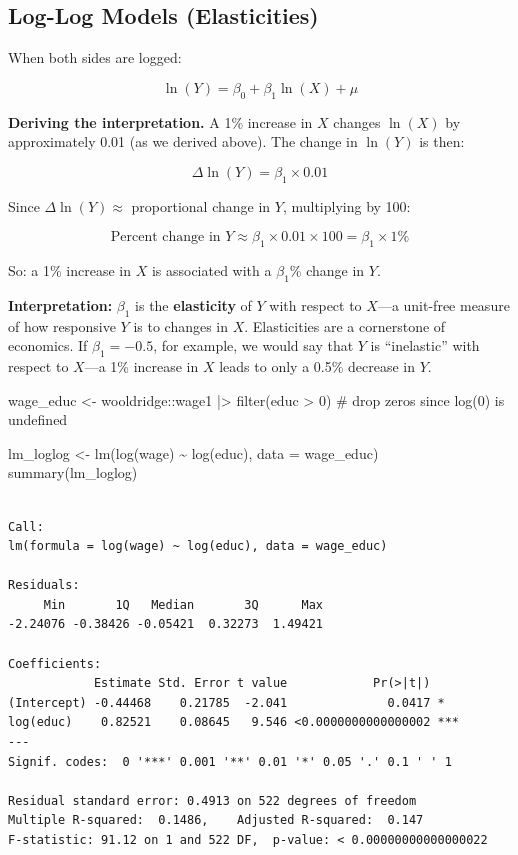 \documentclass[
  letterpaper,
  DIV=11,
  numbers=noendperiod]{scrreprt}
\newenvironment{Shaded}{\begin{snugshade}}{\end{snugshade}}
\newcommand{\AttributeTok}[1]{\textcolor[rgb]{0.40,0.45,0.13}{#1}}
\newcommand{\CommentTok}[1]{\textcolor[rgb]{0.37,0.37,0.37}{#1}}
\newcommand{\DecValTok}[1]{\textcolor[rgb]{0.68,0.00,0.00}{#1}}
\newcommand{\FunctionTok}[1]{\textcolor[rgb]{0.28,0.35,0.67}{#1}}
\newcommand{\NormalTok}[1]{\textcolor[rgb]{0.00,0.23,0.31}{#1}}
\newcommand{\OtherTok}[1]{\textcolor[rgb]{0.00,0.23,0.31}{#1}}
\newcommand{\SpecialCharTok}[1]{\textcolor[rgb]{0.37,0.37,0.37}{#1}}
\begin{document}
\subsection{Log-Log Models
(Elasticities)}\label{log-log-models-elasticities}

When both sides are logged:

\[
\ln(Y) = \beta_0 + \beta_1 \ln(X) + \mu
\]

\textbf{Deriving the interpretation.} A 1\% increase in \(X\) changes
\(\ln(X)\) by approximately 0.01 (as we derived above). The change in
\(\ln(Y)\) is then:

\[
\Delta \ln(Y) = \beta_1 \times 0.01
\]

Since \(\Delta \ln(Y) \approx\) proportional change in \(Y\),
multiplying by 100:

\[
\text{Percent change in } Y \approx \beta_1 \times 0.01 \times 100 = \beta_1 \times 1\%
\]

So: a 1\% increase in \(X\) is associated with a \(\beta_1\)\% change in
\(Y\).

\textbf{Interpretation:} \(\beta_1\) is the \textbf{elasticity} of \(Y\)
with respect to \(X\)---a unit-free measure of how responsive \(Y\) is
to changes in \(X\). Elasticities are a cornerstone of economics. If
\(\beta_1 = -0.5\), for example, we would say that \(Y\) is
``inelastic'' with respect to \(X\)---a 1\% increase in \(X\) leads to
only a 0.5\% decrease in \(Y\).

\begin{Shaded}
\begin{Highlighting}[]
\NormalTok{wage\_educ }\OtherTok{\textless{}{-}}\NormalTok{ wooldridge}\SpecialCharTok{::}\NormalTok{wage1 }\SpecialCharTok{|\textgreater{}}
    \FunctionTok{filter}\NormalTok{(educ }\SpecialCharTok{\textgreater{}} \DecValTok{0}\NormalTok{)  }\CommentTok{\# drop zeros since log(0) is undefined}

\NormalTok{lm\_loglog }\OtherTok{\textless{}{-}} \FunctionTok{lm}\NormalTok{(}\FunctionTok{log}\NormalTok{(wage) }\SpecialCharTok{\textasciitilde{}} \FunctionTok{log}\NormalTok{(educ), }\AttributeTok{data =}\NormalTok{ wage\_educ)}
\FunctionTok{summary}\NormalTok{(lm\_loglog)}
\end{Highlighting}
\end{Shaded}

\begin{verbatim}

Call:
lm(formula = log(wage) ~ log(educ), data = wage_educ)

Residuals:
     Min       1Q   Median       3Q      Max 
-2.24076 -0.38426 -0.05421  0.32273  1.49421 

Coefficients:
            Estimate Std. Error t value            Pr(>|t|)    
(Intercept) -0.44468    0.21785  -2.041              0.0417 *  
log(educ)    0.82521    0.08645   9.546 <0.0000000000000002 ***
---
Signif. codes:  0 '***' 0.001 '**' 0.01 '*' 0.05 '.' 0.1 ' ' 1

Residual standard error: 0.4913 on 522 degrees of freedom
Multiple R-squared:  0.1486,    Adjusted R-squared:  0.147 
F-statistic: 91.12 on 1 and 522 DF,  p-value: < 0.00000000000000022
\end{verbatim}
\end{document}
